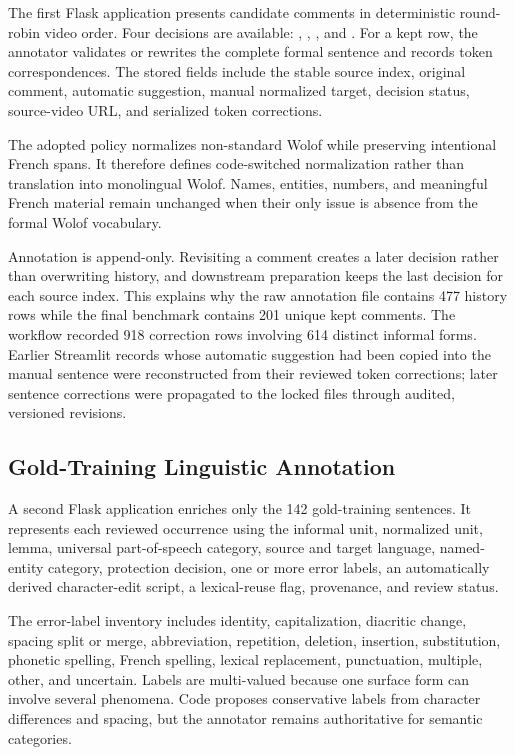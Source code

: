 \documentclass[12pt, a4paper, twoside, openany]{report}
\begin{document}
The first Flask application presents candidate comments in deterministic round-robin video order. Four decisions are available: , , , and . For a kept row, the annotator validates or rewrites the complete formal sentence and records token correspondences. The stored fields include the stable source index, original comment, automatic suggestion, manual normalized target, decision status, source-video URL, and serialized token corrections.

The adopted policy normalizes non-standard Wolof while preserving intentional French spans. It therefore defines code-switched normalization rather than translation into monolingual Wolof. Names, entities, numbers, and meaningful French material remain unchanged when their only issue is absence from the formal Wolof vocabulary.

Annotation is append-only. Revisiting a comment creates a later decision rather than overwriting history, and downstream preparation keeps the last decision for each source index. This explains why the raw annotation file contains 477 history rows while the final benchmark contains 201 unique kept comments. The workflow recorded 918 correction rows involving 614 distinct informal forms. Earlier Streamlit records whose automatic suggestion had been copied into the manual sentence were reconstructed from their reviewed token corrections; later sentence corrections were propagated to the locked files through audited, versioned revisions.


\subsection{Gold-Training Linguistic Annotation}

A second Flask application enriches only the 142 gold-training sentences. It represents each reviewed occurrence using the informal unit, normalized unit, lemma, universal part-of-speech category, source and target language, named-entity category, protection decision, one or more error labels, an automatically derived character-edit script, a lexical-reuse flag, provenance, and review status.

The error-label inventory includes identity, capitalization, diacritic change, spacing split or merge, abbreviation, repetition, deletion, insertion, substitution, phonetic spelling, French spelling, lexical replacement, punctuation, multiple, other, and uncertain. Labels are multi-valued because one surface form can involve several phenomena. Code proposes conservative labels from character differences and spacing, but the annotator remains authoritative for semantic categories.
\end{document}
